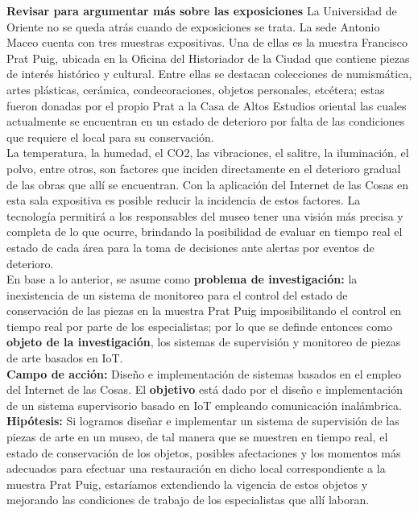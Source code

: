     \textbf{\large Revisar para argumentar más sobre las exposiciones} La Universidad de Oriente no se queda atrás cuando de exposiciones se trata. La sede Antonio Maceo cuenta con tres muestras expositivas. Una de ellas es la muestra Francisco Prat Puig, ubicada en la Oficina del Historiador de la Ciudad que contiene piezas de interés histórico y cultural. Entre ellas se destacan colecciones de numismática, artes plásticas, cerámica, condecoraciones, objetos personales, etcétera; estas fueron donadas por el propio Prat a la Casa de Altos Estudios oriental las cuales actualmente se encuentran en un estado de deterioro por falta de las condiciones que requiere el local para su conservación.\\
    
    La temperatura, la humedad, el CO2, las vibraciones, el salitre, la iluminación, el polvo, entre otros, son factores que inciden directamente en el deterioro gradual de las obras que allí se encuentran. Con la aplicación del Internet de las Cosas en esta sala expositiva es posible reducir la incidencia de estos factores. La tecnología permitirá a los responsables del museo tener una visión más precisa y completa de lo que ocurre, brindando la posibilidad de evaluar en tiempo real el estado de cada área para la toma de decisiones ante alertas por eventos de deterioro.\\

    En base a lo anterior, se asume como \textbf{problema de investigación: }la inexistencia de un sistema de monitoreo para el control del estado de conservación de las piezas en la muestra Prat Puig imposibilitando el control en tiempo real por parte de los especialistas; por lo que se definde entonces como \textbf{objeto de la investigación}, los sistemas de supervisión y monitoreo de piezas de arte basados en IoT.\\ 
    
    \textbf{Campo de acción: }Diseño e implementación de sistemas basados en el empleo del Internet de las Cosas. El \textbf{objetivo} está dado por el diseño e implementación de un sistema supervisorio basado en IoT empleando comunicación inalámbrica.\\

    \textbf{Hipótesis: }Si logramos diseñar e implementar un sistema de supervisión de las piezas de arte en un museo, de tal manera que se muestren en tiempo real, el estado de conservación de los objetos, posibles afectaciones y los momentos más adecuados para efectuar una restauración en dicho local correspondiente a la muestra Prat Puig, estaríamos extendiendo la vigencia de estos objetos y mejorando las condiciones de trabajo de los especialistas que allí laboran.\\

